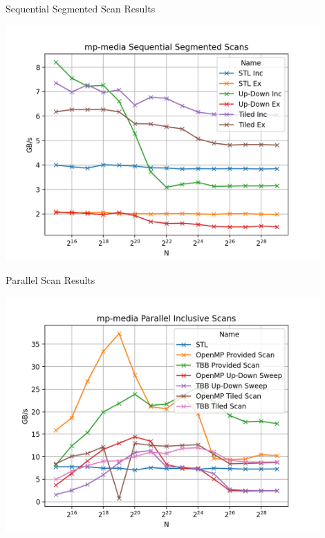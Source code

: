 \begin{frame}{Sequential Segmented Scan Results}
 
  \centering
  \vspace{-5pt}
  \includegraphics[width=0.90\textwidth]{"graphs/mp-media Sequential Segmented Scans"}
 
\end{frame}

\begin{frame}{Parallel Scan Results}
 
  \centering
  \vspace{-5pt}
  \includegraphics[width=0.90\textwidth]{"graphs/mp-media Parallel Inclusive Scans"}
 
\end{frame}

